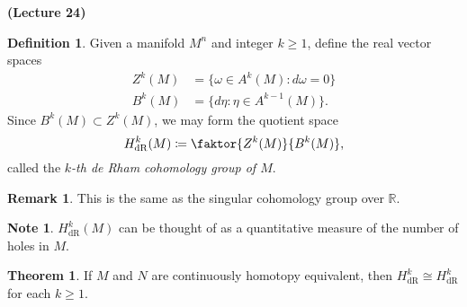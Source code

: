 \documentclass[10pt,letterpaper,cm]{nupset}
\theoremstyle{definition}
\newtheorem*{definition}{Definition}
\newtheorem{remark}{Remark}
\newtheorem{theorem}{Theorem}
\newtheorem*{note}{Note}
\newcommand{\R}{\mathbb R}
\newcommand{\1}{\mathbf{1}}
\newcommand{\0}{\vec 0}
\DeclareMathOperator{\dr}{dR}
\begin{document}
\begin{center}
{\textbf{(Lecture 24)}} 
\end{center}

\begin{definition}
Given a manifold $M^n$ and integer $k\geq 1$, define the real vector spaces
\begin{align*}
  Z^k(M) &  = \{\omega \in A^k(M) : d\omega =0\}
 \\  B^k(M) & = \{ d\eta : \eta \in A^{k-1}(M)\}.
 \end{align*}
 Since $B^k(M) \subset Z^k(M)$, we may form the quotient space $$ H_{\dr}^k(M) \coloneqq  \faktor{Z^k(M)}{B^k(M)},$$ called the \textit{$k$-th de Rham cohomology group of $M$}.
\end{definition}

\begin{remark}
This is the same as the singular cohomology group over $\R$.
\end{remark}

\begin{note}
$H_{\dr}^k(M)$ can be thought of as a quantitative measure of the number of holes in $M$.
\end{note}

\begin{theorem}
If $M$ and $N$ are continuously homotopy equivalent, then $H_{\dr}^k \cong H_{\dr}^k$ for each $k\geq 1$.
\end{theorem}
\end{document}
